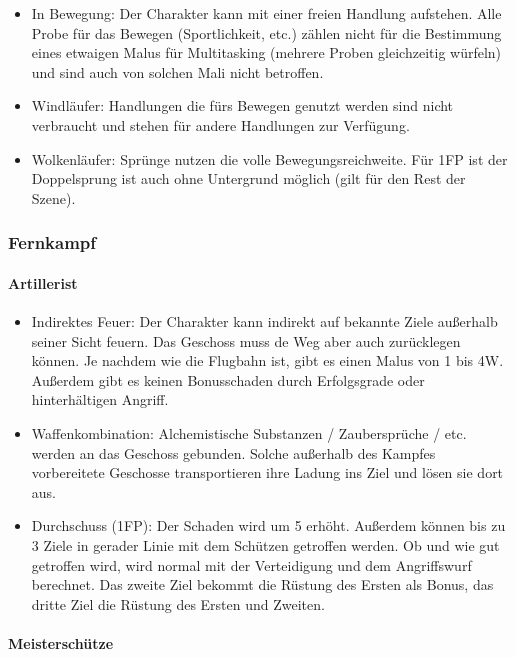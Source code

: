 \documentclass{article}
\begin{document}
\begin{itemize}
\item In Bewegung: Der Charakter kann mit einer freien Handlung aufstehen. Alle Probe für das Bewegen (Sportlichkeit, etc.) zählen nicht für die Bestimmung eines etwaigen Malus für Multitasking (mehrere Proben gleichzeitig würfeln) und sind auch von solchen Mali nicht betroffen.
\item Windläufer: Handlungen die fürs Bewegen genutzt werden sind nicht verbraucht und stehen für andere Handlungen zur Verfügung.
\item Wolkenläufer: Sprünge nutzen die volle Bewegungsreichweite. Für 1FP ist der Doppelsprung ist auch ohne Untergrund möglich (gilt für den Rest der Szene). 
\end{itemize}

\subsubsection{Fernkampf}

\paragraph{Artillerist}

\begin{itemize}
\item Indirektes Feuer: Der Charakter kann indirekt auf bekannte Ziele außerhalb seiner Sicht feuern. Das Geschoss muss de  Weg aber auch zurücklegen können. Je nachdem wie die Flugbahn ist, gibt es einen Malus von 1 bis 4W. Außerdem gibt es keinen Bonusschaden durch Erfolgsgrade oder hinterhältigen Angriff.
\item Waffenkombination: Alchemistische Substanzen / Zaubersprüche / etc. werden an das Geschoss gebunden. Solche außerhalb des Kampfes vorbereitete Geschosse transportieren ihre Ladung ins Ziel und lösen sie dort aus.
\item Durchschuss (1FP): Der Schaden wird um 5 erhöht. Außerdem können bis zu 3 Ziele in gerader Linie mit dem Schützen getroffen werden. Ob und wie gut getroffen wird, wird normal mit der Verteidigung und dem Angriffswurf berechnet. Das zweite Ziel bekommt die Rüstung des Ersten als Bonus, das dritte Ziel die Rüstung des Ersten und Zweiten.
\end{itemize}

\paragraph{Meisterschütze}
\end{document}
